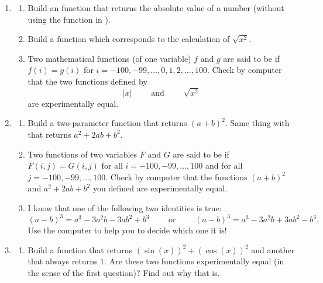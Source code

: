 \documentclass[11pt,class=report,crop=false]{standalone}
\begin{document}
\begin{activite}


\begin{enumerate}
  \item
  \begin{enumerate}
    \item Build an  function that returns the absolute value of a number (without using the  function in \Python{}).

    \item Build a  function which corresponds to the calculation of $\sqrt{x^2}$.

  
  \item Two mathematical functions (of one variable) $f$ and $g$ are said to be  if $f(i)=g(i)$ for $i=-100,-99,\ldots,0,1,2,\ldots,100$. Check by computer that the two functions defined by
  $$|x| \qquad \text{ and } \qquad \sqrt{x^2}$$
  are experimentally equal. 
  
  \end{enumerate}
  
  \item
    \begin{enumerate}
    \item Build a two-parameter function  that returns $(a+b)^2$. Same thing with  that returns $a^2+2ab+b^2$.
 
  \item Two functions of two variables $F$ and $G$ are said to be  if $F(i,j)=G(i,j)$ for all $i=-100,-99,\ldots,100$ and for all $j = -100,-99,\ldots,100$. Check by computer that the functions $(a+b)^2$ and $a^2+2ab+b^2$ you defined are experimentally equal. 
  
   \item I know that one of the following two identities is true:
   $$(a-b)^3 = a^3 - 3a^2b -3ab^2+b^3 \qquad \text{ or } \qquad (a-b)^3 = a^3 - 3a^2b  + 3ab^2 - b^3.$$
   Use the computer to help you to decide which one it is!
   
  \end{enumerate} 
  
  \item 
   \begin{enumerate}
    \item Build a function  that returns $(\sin(x))^2 + (\cos(x))^2$ and another  that always returns $1$. Are these two functions experimentally equal (in the sense of the first question)? Find out why that is.
    

\end{enumerate}
\end{enumerate}
\end{activite}
\end{document}
